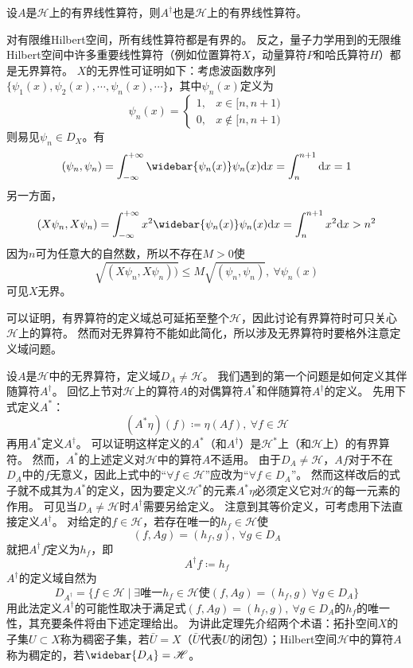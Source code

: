 \begin{theorem}
    设$A$是$\mathscr{H}$上的有界线性算符，则$A^\dagger$也是$\mathscr{H}$上的有界线性算符。
\end{theorem}

对有限维Hilbert空间，所有线性算符都是有界的。
反之，量子力学用到的无限维Hilbert空间中许多重要线性算符（例如位置算符$X$，动量算符$P$和哈氏算符$H$）都是无界算符。
$X$的无界性可证明如下：考虑波函数序列$\{\psi_1(x), \psi_2(x), \cdots, \psi_n(x), \cdots \}$，其中$\psi_n(x)$定义为
\[\psi_n(x) = \begin{cases}
    1, & x \in [n, n + 1) \\
    0, & x \notin [n, n + 1)
\end{cases}\]
则易见$\psi_n \in D_X$。有
$$(\psi_n, \psi_n) = \int^{+\infty}_{-\infty}\widebar{\psi_n(x)}\psi_n(x)\mathrm{d}x = \int^{n + 1}_n\mathrm{d}x = 1$$
另一方面，
$$(X\psi_n, X\psi_n) = \int^{+\infty}_{-\infty}x^2\widebar{\psi_n(x)}\psi_n(x)\mathrm{d}x = \int^{n + 1}_nx^2\mathrm{d}x > n^2$$
因为$n$可为任意大的自然数，所以不存在$M > 0$使
$$\sqrt{(X\psi_n, X\psi_n))} \leq M\sqrt{(\psi_n, \psi_n)}, ~ \forall \psi_n(x)$$
可见$X$无界。

可以证明，有界算符的定义域总可延拓至整个$\mathscr{H}$，因此讨论有界算符时可只关心$\mathscr{H}$上的算符。
然而对无界算符不能如此简化，所以涉及无界算符时要格外注意定义域问题。

设$A$是$\mathscr{H}$中的无界算符，定义域$D_A \neq \mathscr{H}$。
我们遇到的第一个问题是如何定义其伴随算符$A^\dagger$。
回忆上节对$\mathscr{H}$上的算符$A$的对偶算符$A^*$和伴随算符$A^\dagger$的定义。
先用下式定义$A^*$：
$$(A^*\eta)(f) \coloneq \eta(Af), ~ \forall f \in \mathscr{H}$$
再用$A^*$定义$A^\dagger$。
可以证明这样定义的$A^*$（和$A^\dagger$）是$\mathscr{H}^*$上（和$\mathscr{H}$上）的有界算符。
然而，$A^*$的上述定义对$\mathscr{H}$中的算符$A$不适用。
由于$D_A \neq \mathscr{H}$，$Af$对于不在$D_A$中的$f$无意义，因此上式中的``$\forall f \in \mathscr{H}$''应改为``$\forall f \in D_A$''。
然而这样改后的式子就不成其为$A^*$的定义，因为要定义$\mathscr{H}^*$的元素$A^*\eta$必须定义它对$\mathscr{H}$的每一元素的作用。
可见当$D_A \neq \mathscr{H}$时$A^\dagger$需要另给定义。
注意到其等价定义，可考虑用下法直接定义$A^\dagger$。
对给定的$f \in \mathscr{H}$，若存在唯一的$h_f \in \mathscr{H}$使
$$(f, Ag) = (h_f, g), ~ \forall g \in D_A$$
就把$A^\dagger f$定义为$h_f$，即
$$A^\dagger f \coloneq h_f$$
$A^\dagger$的定义域自然为
$$D_{A^\dagger} = \{f \in \mathscr{H} \mid \exists \text{唯一} h_f \in \mathscr{H} \text{使} (f, Ag) = (h_f, g) ~ \forall g \in D_A\}$$
用此法定义$A^\dagger$的可能性取决于满足式$(f, Ag) = (h_f, g), ~ \forall g \in D_A$的$h_f$的唯一性，其充要条件将由下述定理给出。
为讲此定理先介绍两个术语：拓扑空间$X$的子集$U \subset X$称为稠密子集，若$\bar U = X$（$\bar U$代表$U$的闭包）；Hilbert空间$\mathscr{H}$中的算符$A$称为稠定的，若$\widebar{D_A} = \mathscr{H}$。

